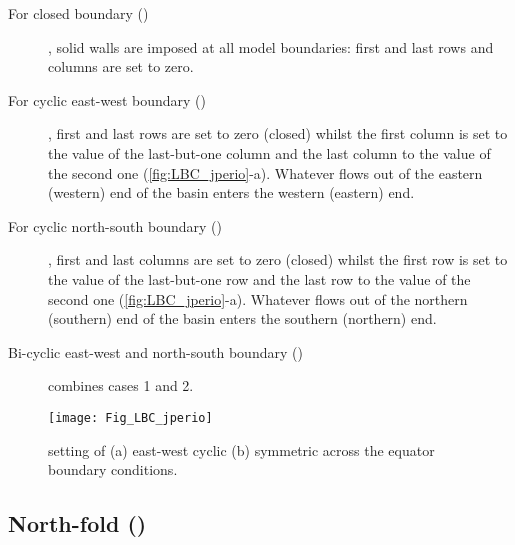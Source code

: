\documentclass[../tex_main/NEMO_manual]{subfiles}
\begin{document}
\begin{description}

\item[For closed boundary ()],
  solid walls are imposed at all model boundaries:
  first and last rows and columns are set to zero.

\item[For cyclic east-west boundary ()],
  first and last rows are set to zero (closed) whilst the first column is set to
  the value of the last-but-one column and the last column to the value of the second one
  (\autoref{fig:LBC_jperio}-a).
  Whatever flows out of the eastern (western) end of the basin enters the western (eastern) end.

\item[For cyclic north-south boundary ()],
  first and last columns are set to zero (closed) whilst the first row is set to
  the value of the last-but-one row and the last row to the value of the second one
  (\autoref{fig:LBC_jperio}-a).
  Whatever flows out of the northern (southern) end of the basin enters the southern (northern) end.

\item[Bi-cyclic east-west and north-south boundary ()] combines cases 1 and 2.

\end{description}

\begin{figure}[!t]     \begin{center}
\texttt{[image: Fig\_LBC\_jperio]}
\caption{    \protect\label{fig:LBC_jperio}
  setting of (a) east-west cyclic  (b) symmetric across the equator boundary conditions.}
\end{center}   \end{figure}

\subsection{North-fold (\protect{})}
\label{subsec:LBC_north_fold}
\end{document}
